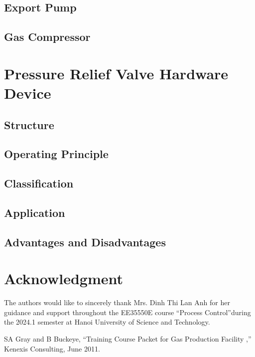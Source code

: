 \documentclass[conference]{IEEEtran}
\begin{document}
\subsection{Export Pump}\label{EP}

\subsection{Gas Compressor}\label{GC}

\section{Pressure Relief Valve Hardware Device}

\subsection{Structure}

\subsection{Operating Principle}

\subsection{Classification}

\subsection{Application}

\subsection{Advantages and Disadvantages}


\section*{Acknowledgment}

The authors would like to sincerely thank Mrs. Dinh Thi Lan Anh for her guidance and support throughout the EE35550E course ``Process Control''during the 2024.1 semester at Hanoi University of Science and Technology.

\begin{thebibliography}{00}
     SA Gray and B Buckeye, ``Training Course Packet for Gas Production Facility ,'' Kenexis Consulting, June 2011.

\end{thebibliography}
\end{document}
